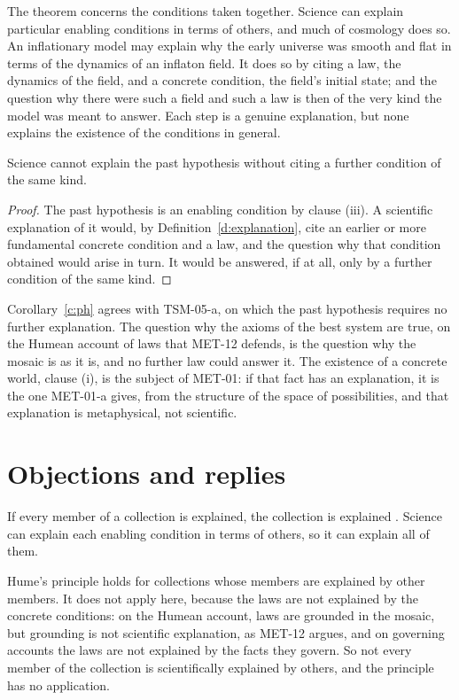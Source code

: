 \documentclass{situationist-preprint}
\begin{document}
The theorem concerns the conditions taken together. Science can explain particular enabling conditions in terms of others, and much of cosmology does so. An inflationary model may explain why the early universe was smooth and flat in terms of the dynamics of an inflaton field. It does so by citing a law, the dynamics of the field, and a concrete condition, the field's initial state; and the question why there were such a field and such a law is then of the very kind the model was meant to answer. Each step is a genuine explanation, but none explains the existence of the conditions in general.

\begin{corollary}\label{c:ph}
Science cannot explain the past hypothesis without citing a further condition of the same kind.
\end{corollary}

\begin{proof}
The past hypothesis is an enabling condition by clause (iii). A scientific explanation of it would, by Definition~\ref{d:explanation}, cite an earlier or more fundamental concrete condition and a law, and the question why that condition obtained would arise in turn. It would be answered, if at all, only by a further condition of the same kind.
\end{proof}

Corollary~\ref{c:ph} agrees with TSM-05-a, on which the past hypothesis requires no further explanation. The question why the axioms of the best system are true, on the Humean account of laws that MET-12 defends, is the question why the mosaic is as it is, and no further law could answer it. The existence of a concrete world, clause (i), is the subject of MET-01: if that fact has an explanation, it is the one MET-01-a gives, from the structure of the space of possibilities, and that explanation is metaphysical, not scientific.

\section{Objections and replies}

\begin{objection}
If every member of a collection is explained, the collection is explained \citep[IX]{HumeDialogues}. Science can explain each enabling condition in terms of others, so it can explain all of them.
\end{objection}

\begin{reply}
Hume's principle holds for collections whose members are explained by other members. It does not apply here, because the laws are not explained by the concrete conditions: on the Humean account, laws are grounded in the mosaic, but grounding is not scientific explanation, as MET-12 argues, and on governing accounts the laws are not explained by the facts they govern. So not every member of the collection is scientifically explained by others, and the principle has no application.
\end{reply}
\end{document}
